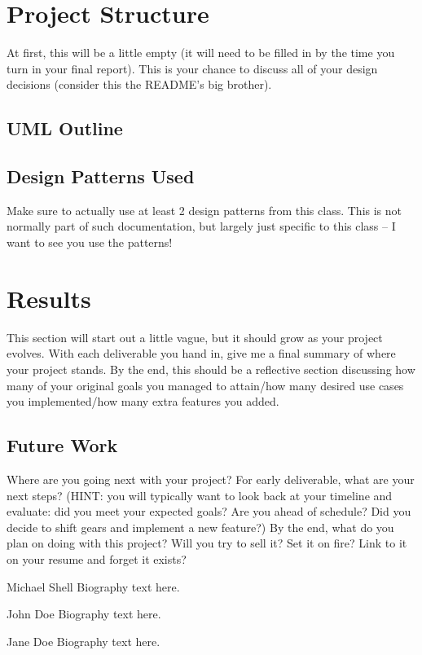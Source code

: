 \documentclass[10pt,conference,onecolumn,compsoc]{IEEEtran}
\begin{document}
\section{Project Structure}
At first, this will be a little empty (it will need to be filled in by the time you turn in your final report).  This is your chance to discuss all of your design decisions (consider this the README's big brother).

\subsection{UML Outline}





\subsection{Design Patterns Used}
Make sure to actually use at least 2 design patterns from this class.  This is not normally part of such documentation, but largely just specific to this class -- I want to see you use the patterns!


\section{Results}
This section will start out a little vague, but it should grow as your project evolves.  With each deliverable you hand in, give me a final summary of where your project stands.  By the end, this should be a reflective section discussing how many of your original goals you managed to attain/how many desired use cases you implemented/how many extra features you added.

\subsection{Future Work}
Where are you going next with your project?
For early deliverable, what are your next steps?  (HINT: you will typically want to look back at your timeline and evaluate: did you meet your expected goals?  Are you ahead of schedule?  Did you decide to shift gears and implement a new feature?)
By the end, what do you plan on doing with this project?  Will you try to sell it?  Set it on fire?  Link to it on your resume and forget it exists?




\begin{IEEEbiography}{Michael Shell}
Biography text here.
\end{IEEEbiography}

\begin{IEEEbiographynophoto}{John Doe}
Biography text here.
\end{IEEEbiographynophoto}

\begin{IEEEbiographynophoto}{Jane Doe}
Biography text here.
\end{IEEEbiographynophoto}
\end{document}
